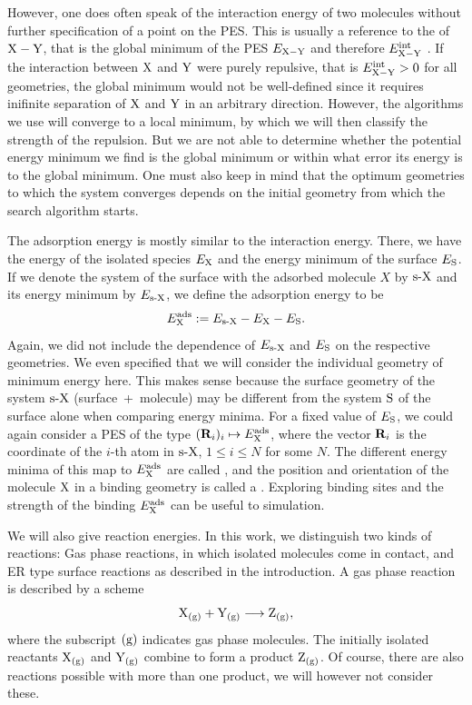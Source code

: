 \documentclass[8.5pt,twoside,twocolumn]{article}
\newcommand\eint{\enmat{E^{\te{int}}}}
\newcommand\eads{\enmat{E^{\te{ads}}}}
\newcommand\gas{\enmat{_\te{(g)}}}
\theoremstyle{standard}
\begin{document}
However, one does often speak of the interaction energy of two molecules without further specification
of a point on the PES. This is usually a reference to the 
of $\XY$, that is the global minimum of the PES $E_{\XY}$ and therefore
$\eint_\XY$ . If the interaction between $\X$ and $\Y$ were purely repulsive,
that is $\eint_{\XY} > 0$ for all geometries, the global minimum would not be
well-defined since it requires inifinite separation of $\X$ and $\Y$ in an
arbitrary direction.
However, the algorithms we use will converge to a local minimum, by which we
will then classify the strength of the repulsion. But we are not able to
determine whether the potential energy minimum we find is the global minimum or
within what error its energy is to the global minimum. One must also keep in
mind that the optimum geometries to which the system converges depends on the
initial geometry from which the search algorithm starts.

The adsorption energy is mostly similar to the interaction energy. There, we
have the energy of the isolated species $E_\X$ and the energy minimum of the
surface $E_{\S}$. If we denote the system of the surface with the adsorbed
molecule $X$ by $\sX$ and its energy minimum by $E_{\sX}$, we define the
adsorption energy to be
\begin{equation}
 \eads_{\X}:= E_{\sX} - E_\X - E_\S.
 \label{Theo:AdsorptionEnergy}
\end{equation}
Again, we did not include the dependence of $E_\sX$ and $E_\S$ on the respective
geometries. We even specified that we will consider the individual geometry of
minimum energy here. This makes sense because the surface geometry of the system
$\sX$ \mbox{(surface + molecule)} may be different from the system $\S$ of the
surface alone when comparing energy minima. For a fixed value of $E_\S$, we
could again consider a PES of the type \mbox{$(\bo R_i)_i \mapsto \eads_\X$},
where the vector $\bo R_i$ is the coordinate of the $i$-th atom in $\sX$, $1 \le
i \le N$ for some $N$. The different energy minima of this map to $\eads_\X$ are
called , and the position and orientation of the
molecule $\X$ in a binding geometry is called a .
Exploring binding sites and the strength of the binding $\eads_\X$ can be useful
to simulation.

We will also give reaction energies. In this work, we distinguish two kinds of reactions:
Gas phase reactions, in which isolated molecules come in contact, and
ER type %
surface reactions as described in the
introduction. A gas phase reaction is described by a scheme 
\begin{equation}
 \X\gas+\Y\gas \chemar  \Z\gas,
 \label{Theo:GasReactionScheme}
\end{equation} 
where the subscript $(\te g)$ indicates gas phase molecules. The initially
isolated reactants $\X\gas$ and $\Y\gas$ combine to form a product $\Z\gas$. Of course,
there are also reactions possible with more than one product, we will however not
consider these.
\end{document}

